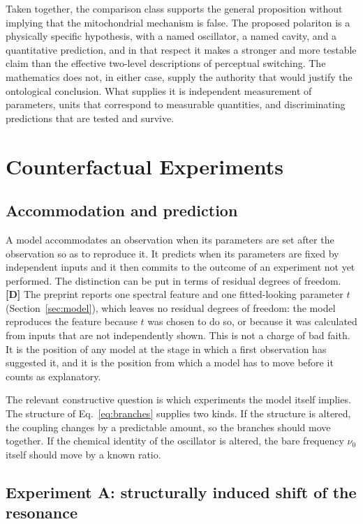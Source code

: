 \documentclass[11pt]{article}
\newcommand{\stD}{\textbf{\textcolor{green!40!black}{[D]}}}
\theoremstyle{plain}
\theoremstyle{definition}
\theoremstyle{remark}
\begin{document}
Taken together, the comparison class supports the general proposition without implying that the mitochondrial mechanism is false. The proposed polariton is a physically specific hypothesis, with a named oscillator, a named cavity, and a quantitative prediction, and in that respect it makes a stronger and more testable claim than the effective two-level descriptions of perceptual switching. The mathematics does not, in either case, supply the authority that would justify the ontological conclusion. What supplies it is independent measurement of parameters, units that correspond to measurable quantities, and discriminating predictions that are tested and survive.

\section{Counterfactual Experiments}
\label{sec:cf}

\subsection{Accommodation and prediction}

A model accommodates an observation when its parameters are set after the observation so as to reproduce it. It predicts when its parameters are fixed by independent inputs and it then commits to the outcome of an experiment not yet performed. The distinction can be put in terms of residual degrees of freedom. \stD{} The preprint reports one spectral feature and one fitted-looking parameter $t$ (Section~\ref{sec:model}), which leaves no residual degrees of freedom: the model reproduces the feature because $t$ was chosen to do so, or because it was calculated from inputs that are not independently shown. This is not a charge of bad faith. It is the position of any model at the stage in which a first observation has suggested it, and it is the position from which a model has to move before it counts as explanatory.

The relevant constructive question is which experiments the model itself implies. The structure of Eq.~\eqref{eq:branches} supplies two kinds. If the structure is altered, the coupling changes by a predictable amount, so the branches should move together. If the chemical identity of the oscillator is altered, the bare frequency $\nu_0$ itself should move by a known ratio.

\subsection{Experiment A: structurally induced shift of the resonance}
\end{document}
